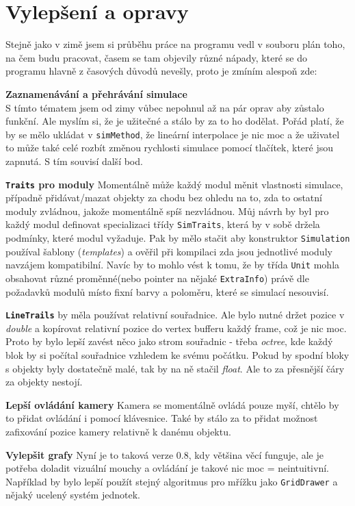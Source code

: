 \section{Vylepšení a opravy}
Stejně jako v zimě jsem si průběhu práce na programu vedl v souboru plán toho, na čem budu pracovat, časem
se tam objevily různé nápady, které se do programu hlavně z časových důvodů nevešly, proto
je zmíním alespoň zde:
\begin{description}
	\item \textbf{Zaznamenávání a přehrávání simulace} \\
	S tímto tématem jsem od zimy vůbec nepohnul až na pár oprav aby zůstalo funkční. Ale myslím si, že je užitečné a stálo by za to ho dodělat. Pořád platí, že by se mělo ukládat v \texttt{simMethod}, že lineární interpolace je nic moc a že uživatel to může také celé rozbít změnou rychlosti simulace pomocí tlačítek, které jsou zapnutá. S tím souvisí další bod.
	\item \textbf{\texttt{Traits} pro moduly}
	Momentálně může každý modul měnit vlastnosti simulace, případně přidávat/mazat objekty za chodu bez ohledu na to, zda to ostatní moduly zvládnou, jakože momentálně spíš nezvládnou. Můj návrh by byl pro každý modul definovat specializaci třídy \texttt{SimTraits}, která by v sobě držela podmínky, které modul vyžaduje. Pak by mělo stačit aby konstruktor \texttt{Simulation} používal šablony (\textit{templates}) a ověřil při kompilaci zda jsou jednotlivé moduly navzájem kompatibilní.
	Navíc by to mohlo vést k tomu, že by třída \texttt{Unit} mohla obsahovat různé proměnné(nebo pointer na nějaké \texttt
	{ExtraInfo}) právě dle požadavků modulů místo fixní barvy a poloměru, které se simulací nesouvisí.
	\item \textbf{\texttt{LineTrails}} by měla používat relativní souřadnice. Ale bylo nutné držet pozice v \textit{double} a kopírovat relativní pozice do vertex bufferu každý frame, což je nic moc. Proto by bylo lepší zavést něco jako strom souřadnic - třeba \textit{octree}, kde každý blok by si počítal souřadnice vzhledem ke svému počátku. Pokud by spodní bloky s objekty byly dostatečně malé, tak by na ně stačil \textit{float}. Ale to za přesnější čáry za objekty nestojí.
	\item \textbf{Lepší ovládání kamery} Kamera se momentálně ovládá pouze myší, chtělo by to přidat ovládání i pomocí klávesnice. Také by stálo za to přidat možnost zafixování pozice kamery relativně k danému objektu. 
	\item \textbf{Vylepšit grafy} Nyní je to taková verze 0.8, kdy většina věcí funguje, ale je potřeba doladit vizuální mouchy a ovládání je takové nic moc = neintuitivní. Například by bylo lepší použít stejný algoritmus pro mřížku jako \texttt{GridDrawer} a nějaký ucelený systém jednotek.

\end{description}
